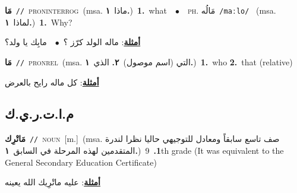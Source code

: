\documentclass[10pt,a4paper,twoside]{article} %
\begin{document}
\begin{multicols}{2}
{\setlength\topsep{0pt}\textbf{\foreignlanguage{arabic}{مَا}}\ {\color{gray}\texttt{//}\color{black}}\ \textsc{pron\textunderscore interrog}\ \color{gray}(msa. \foreignlanguage{arabic}{ماذا}~\foreignlanguage{arabic}{\textbf{١.}})\color{black}\ \textbf{1.}~what\ \ $\bullet$\ \ \textsc{ph.} \color{gray} \foreignlanguage{arabic}{مَالُه}\color{black}\ {\color{gray}\texttt{/{\sffamily maːlo}/}\color{black}}\ \color{gray} (msa. \foreignlanguage{arabic}{لماذا}~\foreignlanguage{arabic}{\textbf{١.}})\color{black}\ \textbf{1.}~Why?\  \begin{flushright}\color{gray}\foreignlanguage{arabic}{\textbf{\underline{\foreignlanguage{arabic}{أمثلة}}}: ماله الولد كرّز ؟\ $\bullet$\ \  مابِك يا ولد؟}\end{flushright}\color{black}} \vspace{2mm}

{\setlength\topsep{0pt}\textbf{\foreignlanguage{arabic}{مَا}}\ {\color{gray}\texttt{//}\color{black}}\ \textsc{pron\textunderscore rel}\ \color{gray}(msa. \foreignlanguage{arabic}{التي (اسم موصول)}~\foreignlanguage{arabic}{\textbf{٢.}}  \foreignlanguage{arabic}{الذي}~\foreignlanguage{arabic}{\textbf{١.}})\color{black}\ \textbf{1.}~who  \textbf{2.}~that (relative)\  \begin{flushright}\color{gray}\foreignlanguage{arabic}{\textbf{\underline{\foreignlanguage{arabic}{أمثلة}}}: كل ماله رايح بالعرض}\end{flushright}\color{black}} \vspace{2mm}

\vspace{-3mm}
\subsection*{\color{blue}\foreignlanguage{arabic}{م.ا.ت.ر.ي.ك}\color{blue}{ (ntws)}} 

{\setlength\topsep{0pt}\textbf{\foreignlanguage{arabic}{مَاتْرِك}}\ {\color{gray}\texttt{//}\color{black}}\ \textsc{noun}\ [m.]\ \color{gray}(msa. \foreignlanguage{arabic}{صف تاسع سابقاً ومعادل للتوجيهي حاليا نظرا لندرة المتقدمين لهذه المرحلة في السابق}~\foreignlanguage{arabic}{\textbf{١.}})\color{black}\ \textbf{1.}~9th grade (It was equivalent to the General Secondary Education Certificate)\  \begin{flushright}\color{gray}\foreignlanguage{arabic}{\textbf{\underline{\foreignlanguage{arabic}{أمثلة}}}: عليه ماتْرِيك الله يعينه}\end{flushright}\color{black}} \vspace{2mm}


\end{multicols}
\end{document}
